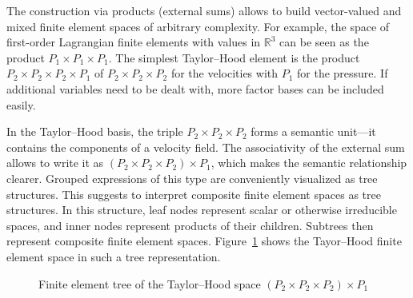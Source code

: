 \documentclass[a4paper,10pt,headings=normal,bibliography=totoc]{scrartcl}
\newcommand{\R}{\mathbb{R}}
\begin{document}
The construction via products (external sums) allows to build vector-valued and mixed finite element spaces of arbitrary complexity.
For example, the space of
first-order Lagrangian finite elements with values in $\R^3$ can be seen as the product $P_1 \times P_1 \times P_1$.
The simplest Taylor--Hood element is the product $P_2 \times P_2 \times P_2 \times P_1$
of $P_2 \times P_2 \times P_2$ for the velocities with $P_1$ for the pressure.
If additional variables need to be dealt with, more factor bases can be included easily.

In the Taylor--Hood basis, the triple
$P_2 \times P_2 \times P_2$ forms a semantic unit---it contains the components of a velocity field.
The associativity of the external sum allows to write it
as $(P_2 \times P_2 \times P_2) \times P_1$, which makes the semantic relationship clearer.
Grouped expressions of this type are conveniently visualized as tree structures.  This
suggests to interpret composite
finite element spaces as tree structures.  In this structure, leaf nodes represent scalar or otherwise irreducible spaces,
and inner nodes represent products of their children.  Subtrees then represent composite
finite element spaces.  Figure~\ref{fig:taylor_hood_basis_tree} shows the Tayor--Hood finite element
space in such a tree representation.

\begin{figure}
    \begin{center}
    \end{center}
    \caption{Finite element tree of the Taylor--Hood space $(P_2 \times P_2 \times P_2)\times P_1$}
    \label{fig:taylor_hood_basis_tree}
\end{figure}

\end{document}
